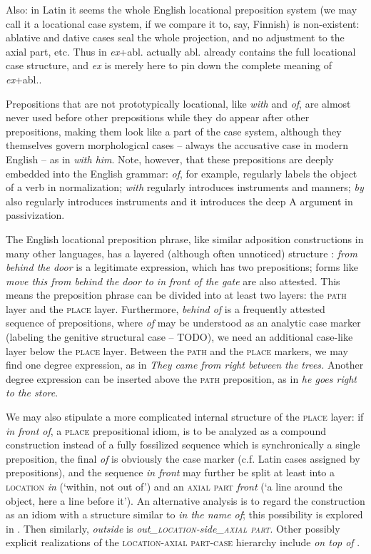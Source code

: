 \documentclass[UTF8, a4paper, oneside, scheme=plain, 12pt]{ctexbook}
\newcommand{\form}[1]{\emph{#1}}
\newcommand{\category}[1]{\textsc{#1}}
\newcommand{\translate}[1]{`#1'}
\begin{document}
Also: in Latin it seems the whole English locational preposition system 
(we may call it a locational case system, if we compare it to, say, Finnish)
is non-existent: ablative and dative cases seal the whole projection, 
and no adjustment to the axial part, etc.
Thus in \form{ex}+abl. actually abl. already contains the full locational case structure,
and \form{ex} is merely here to pin down the complete meaning of \form{ex}+abl..

Prepositions that are not prototypically locational, 
like \form{with} and \form{of}, are almost never used 
before other prepositions 
while they do appear after other prepositions,
making them look like a part of the case system, 
although they themselves govern morphological cases -- 
always the accusative case in modern English --
as in \form{with him}.
Note, however, that these prepositions are deeply embedded into the English grammar:
\form{of}, for example, regularly labels the object 
of a verb in normalization;
\form{with} regularly introduces instruments and manners; 
\form{by} also regularly introduces instruments 
and it introduces the deep A argument in passivization.


The English locational preposition phrase, 
like similar adposition constructions in many other languages, 
has a layered (although often unnoticed) structure \citep{spatialpp}:
\form{from behind the door} is a legitimate expression, which has two prepositions;
forms like \form{move this from behind the door to in front of the gate}
are also attested.
This means the preposition phrase can be divided into at least two layers:
the \category{path} layer and the \category{place} layer.
Furthermore, \form{behind of} is a frequently attested sequence of prepositions,
where \form{of} may be understood as an analytic case marker
(labeling the genitive structural case -- TODO), 
we need an additional case-like layer below the \category{place} layer.
Between the \category{path} and the \category{place} markers, 
we may find one degree expression, as in 
\form{They came from right between the trees.}
Another degree expression can be inserted above the \category{path} preposition,
as in \form{he goes right to the store}.

We may also stipulate a more complicated internal structure of the \category{place} layer:
if \form{in front of}, a \category{place} prepositional idiom, 
is to be analyzed as a compound construction
instead of a fully fossilized sequence which is synchronically a single preposition,
the final \form{of} is obviously the case marker 
(c.f. Latin cases assigned by prepositions),
and the sequence \form{in front} may further be split at least into 
a \category{location} \form{in} (\translate{within, not out of}) 
and an \category{axial part} \form{front} (\translate{a line around the object, here a line before it}).
An alternative analysis is to regard the construction as an idiom 
with a structure similar to \form{in the name of};
this possibility is explored in .
Then similarly, \form{outside} is \form{out_{\category{location}}-side_{\category{axial part}}}.
Other possibly explicit realizations of the 
\category{location}-\category{axial part}-\category{case} hierarchy
include \form{on top of} \citep{spatialpp}.
\end{document}
